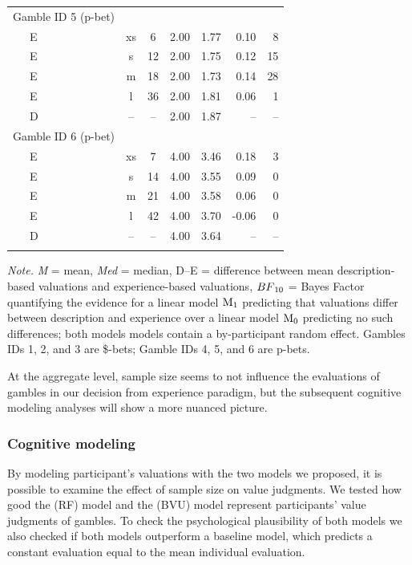 \documentclass[
  a4paper, man, floatsintext]{apa6}
\begin{document}
\begin{table}[tbp]
\begin{center}
\begin{threeparttable}
\begin{tabular}{lccccrr}
Gamble ID 5 (p-bet) &  &  &  &  &  & \\
\ \ \ E & xs & 6 & 2.00 & 1.77 & 0.10 & 8\\
\ \ \ E & s & 12 & 2.00 & 1.75 & 0.12 & 15\\
\ \ \ E & m & 18 & 2.00 & 1.73 & 0.14 & 28\\
\ \ \ E & l & 36 & 2.00 & 1.81 & 0.06 & 1\\
\ \ \ D & -- & -- & 2.00 & 1.87 & -- & --\\
Gamble ID 6 (p-bet) &  &  &  &  &  & \\
\ \ \ E & xs & 7 & 4.00 & 3.46 & 0.18 & 3\\
\ \ \ E & s & 14 & 4.00 & 3.55 & 0.09 & 0\\
\ \ \ E & m & 21 & 4.00 & 3.58 & 0.06 & 0\\
\ \ \ E & l & 42 & 4.00 & 3.70 & -0.06 & 0\\
\ \ \ D & -- & -- & 4.00 & 3.64 & -- & --\\
\bottomrule
\addlinespace
\end{tabular}

\begin{tablenotes}[para]
\normalsize{\textit{Note.} \textit{M} = mean, \textit{Med} = median, D--E = difference between mean description-based valuations and experience-based valuations, $BF\textsubscript{10}$ = Bayes Factor quantifying the evidence for a linear model $\mathrm{M}\textsubscript{1}$ predicting that valuations differ between description and experience over a linear model $\mathrm{M}\textsubscript{0}$ predicting no such differences; both models models contain a by-participant random effect. Gambles IDs 1, 2, and 3 are \$-bets; Gamble IDs 4, 5, and 6 are p-bets.}
\end{tablenotes}

\end{threeparttable}
\end{center}

\end{table}

At the aggregate level, sample size seems to not influence the
evaluations of gambles in our decision from experience paradigm, but the
subsequent cognitive modeling analyses will show a more nuanced picture.

\subsubsection{Cognitive modeling}

By modeling participant's valuations with the two models we proposed, it
is possible to examine the effect of sample size on value judgments. We
tested how good the  (RF) model and the
 (BVU) model represent
participants' value judgments of gambles. To check the psychological
plausibility of both models we also checked if both models outperform a
baseline model, which predicts a constant evaluation equal to the mean
individual evaluation.
\end{document}
